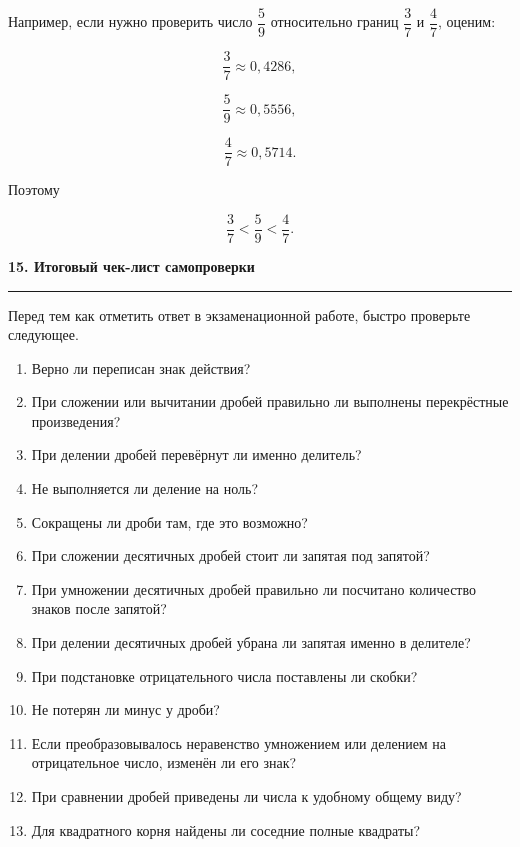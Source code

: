 \documentclass[a4paper,12pt]{article}
\newcommand{\topic}[1]{%
    \par\vspace{0.9em}%
    {\Large\bfseries\color{darkaccent}#1}\par
    \vspace{0.25em}
    \noindent
    \color{accent}\rule{\linewidth}{0.6pt}
    \color{black}
    \vspace{0.55em}
}
\begin{document}
Например, если нужно проверить число $\dfrac59$ относительно
границ $\dfrac37$ и $\dfrac47$, оценим:

\[
\frac37\approx0{,}4286,
\]

\[
\frac59\approx0{,}5556,
\]

\[
\frac47\approx0{,}5714.
\]

Поэтому

\[
\frac37<\frac59<\frac47.
\]


\topic{15. Итоговый чек-лист самопроверки}

Перед тем как отметить ответ в экзаменационной работе,
быстро проверьте следующее.

\begin{enumerate}[label=\arabic*)]

    \item Верно ли переписан знак действия?

    \item При сложении или вычитании дробей правильно ли
    выполнены перекрёстные произведения?

    \item При делении дробей перевёрнут ли именно делитель?

    \item Не выполняется ли деление на ноль?

    \item Сокращены ли дроби там, где это возможно?

    \item При сложении десятичных дробей стоит ли
    запятая под запятой?

    \item При умножении десятичных дробей правильно ли
    посчитано количество знаков после запятой?

    \item При делении десятичных дробей убрана ли запятая
    именно в делителе?

    \item При подстановке отрицательного числа поставлены ли
    скобки?

    \item Не потерян ли минус у дроби?

    \item Если преобразовывалось неравенство умножением или
    делением на отрицательное число, изменён ли его знак?

    \item При сравнении дробей приведены ли числа
    к удобному общему виду?

    \item Для квадратного корня найдены ли соседние
    полные квадраты?

\end{enumerate}
\end{document}
